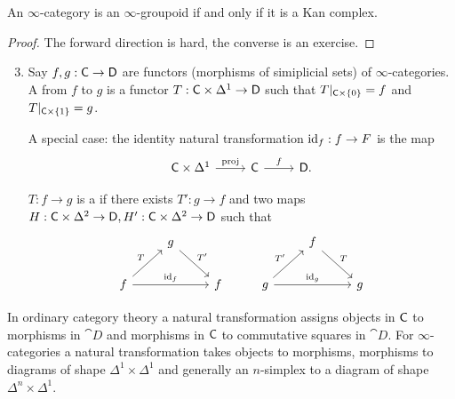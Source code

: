 \begin{theorem}[Joyal]
	An $\infty$-category is an $\infty$-groupoid if and only if it is a Kan complex.
\end{theorem}
\begin{proof}
	The forward direction is hard, the converse is an exercise.
\end{proof}
\begin{definition}\leavevmode
	\begin{enumerate}[1.]
		\setcounter{enumi}{2}
		\item Say $f,g:\C\to \cat{D}$ are functors (morphisms of simiplicial sets) of $\infty$-categories. A  from $f$ to $g$ is a functor $T:\C\times \Delta^{1}\to \cat{D}$ such that $T|_{\mathsf{C}\times \{0\} }=f$ and $T|_{\mathsf{C}\times \{1\}}=g$.

			A special case: the identity natural transformation $\id_f:f\to F$ is the map
			\[
			\begin{tikzcd}
				\C\times \Delta^{1} \ar[r,"\text{proj}"] & \C \ar[r,"f"] & \cat{D}.
			\end{tikzcd}
			\] 

			$T:f\to g$ is a  if there exists $T':g\to f$ and two maps $H:\C\times \Delta^2\to \cat{D},H':\C\times \Delta^2\to \cat{D}$ such that
			\[
			\begin{tikzcd}
				& g \ar[dr,"T'"] & & & f \ar[dr,"T"] \\
				f \ar[ur,"T"] \ar[rr,"\id_f"] & & f & g \ar[ur,"T'"] \ar[rr,"\id_g"] & & g
			\end{tikzcd}
			\] 
	\end{enumerate}
\end{definition}
In ordinary category theory a natural transformation assigns objects in $\mathsf{C}$ to morphisms in $\cat{D}$ and morphisms in $\mathsf{C}$ to commutative squares in $\cat{D}$. For $\infty$-categories a natural transformation takes objects to morphisms, morphisms to diagrams of shape $\Delta^{1}\times \Delta^{1}$ and generally an $n$-simplex to a diagram of shape $\Delta^{n}\times \Delta^{1}$.

